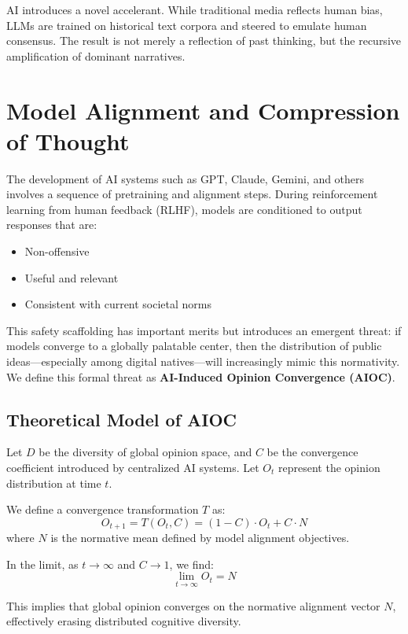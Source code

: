 \documentclass[11pt]{article}
\begin{document}
AI introduces a novel accelerant. While traditional media reflects human bias, LLMs are trained on historical text corpora and steered to emulate human consensus. The result is not merely a reflection of past thinking, but the recursive amplification of dominant narratives.

\section{Model Alignment and Compression of Thought}
The development of AI systems such as GPT, Claude, Gemini, and others involves a sequence of pretraining and alignment steps. During reinforcement learning from human feedback (RLHF), models are conditioned to output responses that are:\begin{itemize}
  \item Non-offensive
  \item Useful and relevant
  \item Consistent with current societal norms
\end{itemize}

This safety scaffolding has important merits but introduces an emergent threat: if models converge to a globally palatable center, then the distribution of public ideas—especially among digital natives—will increasingly mimic this normativity. We define this formal threat as \textbf{AI-Induced Opinion Convergence (AIOC)}.

\subsection{Theoretical Model of AIOC}
Let $D$ be the diversity of global opinion space, and $C$ be the convergence coefficient introduced by centralized AI systems. Let $O_t$ represent the opinion distribution at time $t$.

We define a convergence transformation $T$ as:
\begin{equation}
O_{t+1} = T(O_t, C) = (1 - C) \cdot O_t + C \cdot N
\end{equation}
where $N$ is the normative mean defined by model alignment objectives.

In the limit, as $t \rightarrow \infty$ and $C \rightarrow 1$, we find:
\begin{equation}
\lim_{t\to\infty} O_t = N
\end{equation}

This implies that global opinion converges on the normative alignment vector $N$, effectively erasing distributed cognitive diversity.
\end{document}
